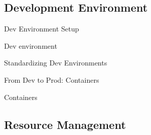 \subsection{Development Environment}

\begin{frame}{Dev Environment Setup}
  \begin{tdcodet}{Dev environment}
  \end{tdcodet}
\end{frame}

\begin{frame}{Standardizing Dev Environments}
  \begin{withmargin}
    \begin{tdmain}
    \end{tdmain}
    \begin{tdmargin}
    \end{tdmargin}
  \end{withmargin}
\end{frame}

\begin{frame}{From Dev to Prod: Containers}
  \begin{withmargin}
    \begin{tdmain}
      \begin{tdcodet}{Containers}
      \end{tdcodet}
    \end{tdmain}
    \begin{tdmargin}
    \end{tdmargin}
  \end{withmargin}
\end{frame}

\subsection{Resource Management}


